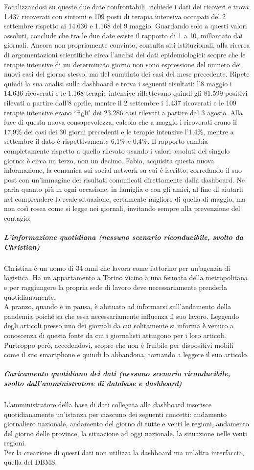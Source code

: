 Focalizzandosi su queste due date confrontabili, richiede i dati dei ricoveri e trova 1.437 ricoverati con sintomi e 109 posti di terapia intensiva occupati del 2 settembre rispetto ai 14.636 e 1.168 del 9 maggio.
Guardando solo a questi valori assoluti, conclude che tra le due date esiste il rapporto di 1 a 10, millantato dai giornali.
Ancora non propriamente convinto, consulta siti istituzionali, alla ricerca di argomentazioni scientifiche circa l'analisi dei dati epidemiologici: scopre che le terapie intensive di un determinato giorno non sono espressione del numero dei nuovi casi del giorno stesso, ma del cumulato dei casi del mese precedente.
Ripete quindi la sua analisi sulla dashboard e trova i seguenti risultati: l'8 maggio i 14.636 ricoverati e le 1.168 terapie intensive riflettevano quindi gli 81.599 positivi rilevati a partire dall'8 aprile, mentre il 2 settembre i 1.437 ricoverati e le 109 terapie intensive erano ``figli" dei 23.286 casi rilevati a partire dal 3 agosto.
Alla luce di questa nuova consapevolezza, calcola che a maggio i ricoverati erano il 17,9\% dei casi dei 30 giorni precedenti e le terapie intensive l'1,4\%, mentre a settembre il dato è rispettivamente 6,1\% e 0,4\%.
Il rapporto cambia completamente rispetto a quello rilevato usando i valori assoluti del singolo giorno: è circa un terzo, non un decimo.
Fabio, acquisita questa nuova informazione, la comunica sui social network su cui è iscritto, corredando il suo post con un'immagine dei risultati comunicati direttamente dalla dashboard.
Ne parla quanto più in ogni occasione, in famiglia e con gli amici, al fine di aiutarli nel comprendere la reale situazione, certamente migliore di quella di maggio, ma non così rosea come si legge nei giornali, invitando sempre alla prevenzione del contagio.
\noindent
\subparagraph{L'informazione quotidiana (nessuno scenario riconducibile, svolto da Christian)}
Christian è un uomo di 34 anni che lavora come fattorino per un'agenzia di logistica.
Ha un appartamento a Torino vicino a una fermata della metropolitana e per raggiungere la propria sede di lavoro deve necessariamente prenderla quotidianamente.\\
A pranzo, quando è in pausa, è abituato ad informarsi sull'andamento della pandemia poiché sa che essa necessariamente influenza il suo lavoro.
Leggendo degli articoli presso uno dei giornali da cui solitamente si informa è venuto a conoscenza di questa fonte da cui i giornalisti attingono per i loro articoli.\\
Purtroppo però, accedendovi, scopre che non è fruibile per dispositivi mobili come il suo smartphone e quindi lo abbandona, tornando a leggere il suo articolo.
\noindent
\subparagraph{Caricamento quotidiano dei dati (nessuno scenario riconducibile, svolto dall'amministratore di database e dashboard)}
L'amministratore della base di dati collegata alla dashboard inserisce quotidianamente un'istanza per ciascuno dei seguenti concetti: andamento giornaliero nazionale, andamento del giorno di tutte e venti le regioni, andamento del giorno delle province, la situazione ad oggi nazionale, la situazione nelle venti regioni.\\
Per la creazione di questi dati non utilizza la dashboard ma un'altra interfaccia, quella del DBMS.